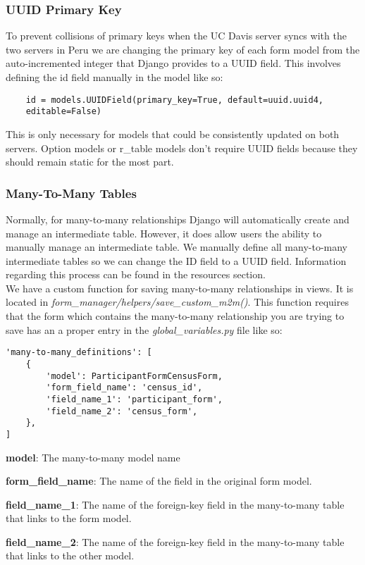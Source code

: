 \documentclass{article}
\begin{document}
\subsubsection{UUID Primary Key}
To prevent collisions of primary keys when the UC Davis server syncs with the two servers in Peru we are changing the primary key of each form model from the auto-incremented integer that Django provides to a UUID field. This involves defining the id field manually in the model like so:
\begin{verbatim}
    id = models.UUIDField(primary_key=True, default=uuid.uuid4, 
    editable=False)
\end{verbatim}
This is only necessary for models that could be consistently updated on both servers. Option models or r\_table models don't require UUID fields because they should remain static for the most part.
\subsubsection{Many-To-Many Tables}
Normally, for many-to-many relationships Django will automatically create and manage an intermediate table. However, it does allow users the ability to manually manage an intermediate table. We manually define all many-to-many intermediate tables so we can change the ID field to a UUID field. Information regarding this process can be found in the resources section.
\\We have a custom function for saving many-to-many relationships in views. It is located in \textit{form\_manager/helpers/save\_custom\_m2m()}. This function requires that the form which contains the many-to-many relationship you are trying to save has an a proper entry in the \textit{global\_variables.py} file like so:
\begin{verbatim}
'many-to-many_definitions': [
    {
        'model': ParticipantFormCensusForm,
        'form_field_name': 'census_id',
        'field_name_1': 'participant_form',
        'field_name_2': 'census_form',
    },
]
\end{verbatim}

\textbf{model}: The many-to-many model name

\textbf{form\_field\_name}: The name of the field in the original form model.

\textbf{field\_name\_1}: The name of the foreign-key field in the many-to-many table that links to the form model.

\textbf{field\_name\_2}: The name of the foreign-key field in the many-to-many table that links to the other model.
\end{document}
